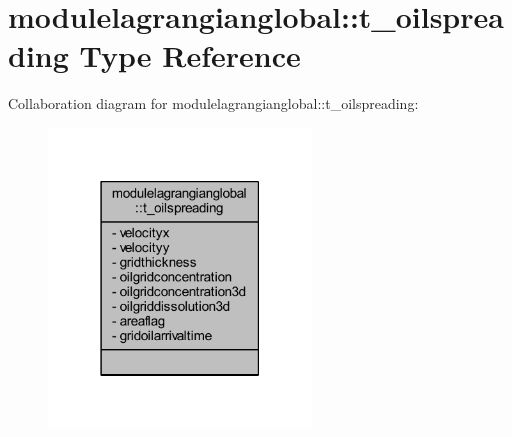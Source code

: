 \hypertarget{structmodulelagrangianglobal_1_1t__oilspreading}{}\section{modulelagrangianglobal\+:\+:t\+\_\+oilspreading Type Reference}
\label{structmodulelagrangianglobal_1_1t__oilspreading}


Collaboration diagram for modulelagrangianglobal\+:\+:t\+\_\+oilspreading\+:\nopagebreak
\begin{figure}[H]
\begin{center}
\leavevmode
\includegraphics[width=198pt]{structmodulelagrangianglobal_1_1t__oilspreading__coll__graph}
\end{center}
\end{figure}
